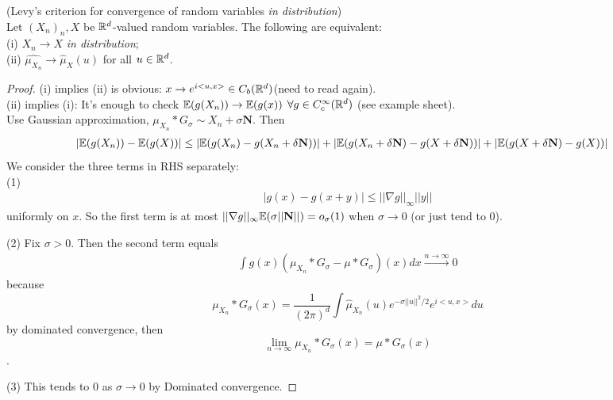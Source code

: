 \documentclass[a4paper]{article}
\begin{document}
\begin{thm} (Levy's criterion for convergence of random variables \emph{in distribution})\\
Let $(X_n)_n,X$ be $\mathbb{R}^d$-valued random variables. The following are equivalent:\\
(i) $X_n \to X$ \emph{in distribution};\\
(ii) $\widehat{\mu_{X_n}} \to \hat{\mu}_X (u)$ for all $u \in \mathbb{R}^d$.
\begin{proof}
(i) implies (ii) is obvious: $x \to e^{i<u,x>} \in C_b (\mathbb{R}^d)$(need to read again).\\
(ii) implies (i): It's enough to check $\mathbb{E} (g(X_n)) \to \mathbb{E}(g(x))$ $\forall g \in C_c^\infty (\mathbb{R}^d)$ (see example sheet).\\
Use Gaussian approximation, $\mu_{X_n} * G_\sigma \sim X_n + \sigma \mathbf{N}$. Then
\begin{equation*}
\begin{aligned}
|\mathbb{E}(g(X_n)) - \mathbb{E}(g(X))| &\leq |\mathbb{E}(g(X_n) - g(X_n+\delta \mathbf{N}))| + |\mathbb{E}(g(X_n+\delta\mathbf{N}) -g(X+\delta \mathbf{N}))| + |\mathbb{E}(g(X+\delta\mathbf{N}) - g(X))|
\end{aligned}
\end{equation*}
We consider the three terms in RHS separately:\\
(1) 
\begin{equation*}
\begin{aligned}
|g(x) - g(x+y)| \leq ||\nabla g||_\infty||y||
\end{aligned}
\end{equation*}
uniformly on $x$. So the first term is at most $||\nabla g||_\infty \mathbb{E}(\sigma||\mathbf{N}||) = o_\sigma(1)$ when $\sigma \to 0$ (or just tend to 0).

(2)
Fix $\sigma > 0$. Then the second term equals
\begin{equation*}
\begin{aligned}
\int g(x) (\mu_{X_n} *G_\sigma - \mu*G_\sigma)(x) dx \xrightarrow{n \to \infty} 0
\end{aligned}
\end{equation*}
because $$\mu_{X_n} * G_\sigma(x) = \frac{1}{(2\pi)^d} \int \hat{\mu}_{X_n} (u) e^{-\sigma||u||^2/2} e^{i<u,x>}du$$ by dominated convergence, then $$\lim_{n \to \infty} \mu_{X_n}*G_\sigma (x) =\mu*G_\sigma(x)$$.

(3) This tends to $0$ as $\sigma \to 0$ by Dominated convergence.
\end{proof}
\end{thm}
\end{document}

